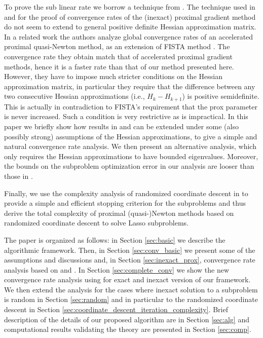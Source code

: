 \documentclass[11pt]{article}
\numberwithin{equation}{section}
\begin{document}
To prove the sub linear rate  we borrow a technique from  \cite{NesterovConvexBook2004, NesterovPolyak, Cartisetal2012}. The technique used in 
  \cite{Beck2009} and \cite{Schmidtetal} for the proof of convergence rates of the (inexact) proximal gradient method do not seem to extend
 to  general positive definite Hessian approximation matrix.  In a  related work \cite{Jiangetal2012}  the authors analyze global convergence rates of an accelerated proximal quasi-Newton method, as an extension of FISTA method \cite{Beck2009}. The convergence rate they obtain match that of accelerated proximal gradient methods, hence it is a faster rate
than that of our method presented here. However,  they have to impose much stricter conditions on the Hessian approximation matrix, in particular they require  that the difference between any two consecutive Hessian approximations (i.e., $H_{k}-H_{k+1}$) is positive semidefinite. This is actually in contradiction to   FISTA's  requirement  that the prox parameter is never increased. Such a condition is very restrictive 
as is impractical. In this paper we briefly show how  results in \cite{Beck2009} and \cite{Schmidtetal}  can be extended under some 
(also possibly strong) assumptions of the Hessian approximations, to give a simple and natural convergence rate analysis. 
We then present an alternative analysis, which only requires the Hessian approximations to have bounded eigenvalues. Moreover, the bounds on the subproblem optimization error in our analysis are looser than those in \cite{Schmidtetal}. 


 
 
 

 
 Finally, we use the complexity analysis of randomized coordinate descent in \cite{Richtarik2012} to provide a simple and efficient stopping criterion for the subproblems and thus derive the total complexity of  proximal (quasi-)Newton methods based on randomized coordinate descent to solve Lasso subproblems. 

 
 
 
The paper is organized as follows: in Section \ref{sec:basic}  we describe the  algorithmic framework. Then,  in Section \ref{sec:conv_basic}  we 
present some of the assumptions and discussions and, in Section \ref{sec:inexact_prox},  convergence rate analysis based on \cite{Beck2009} and \cite{Schmidtetal}. 
In  Section \ref{sec:complete_conv} we show the new convergence rate analysis using  \cite{NesterovConvexBook2004, NesterovPolyak, Cartisetal2012} for exact and inexact
version of our framework.  We then extend the analysis for the cases where inexact solution to a subproblem is random in Section \ref{sec:random}
and in particular to the randomized coordinate descent in Section \ref{sec:coordinate_descent_iteration_complexity}. 
Brief description of the details of our  proposed algorithm are in Section \ref{sec:alg} and  computational results  validating the theory are  presented in Section \ref{sec:comp}.
\end{document}
